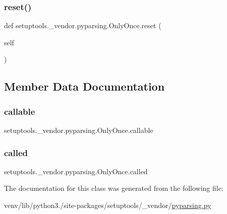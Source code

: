 \subsubsection{\texorpdfstring{reset()}{reset()}}
{\footnotesize\ttfamily def setuptools.\+\_\+vendor.\+pyparsing.\+Only\+Once.\+reset (\begin{DoxyParamCaption}\item[{}]{self }\end{DoxyParamCaption})}



\subsection{Member Data Documentation}
\mbox{\label{classsetuptools_1_1__vendor_1_1pyparsing_1_1OnlyOnce_ad0452c5518c13dabf5477187d8868e4b}} 
\subsubsection{\texorpdfstring{callable}{callable}}
{\footnotesize\ttfamily setuptools.\+\_\+vendor.\+pyparsing.\+Only\+Once.\+callable}

\mbox{\label{classsetuptools_1_1__vendor_1_1pyparsing_1_1OnlyOnce_ab9543043067f60b710c208278b3f0d62}} 
\subsubsection{\texorpdfstring{called}{called}}
{\footnotesize\ttfamily setuptools.\+\_\+vendor.\+pyparsing.\+Only\+Once.\+called}



The documentation for this class was generated from the following file\+:\begin{DoxyCompactItemize}
\item 
venv/lib/python3./site-\/packages/setuptools/\+\_\+vendor/\hyperlink{setuptools_2__vendor_2pyparsing_8py}{pyparsing.\+py}\end{DoxyCompactItemize}
